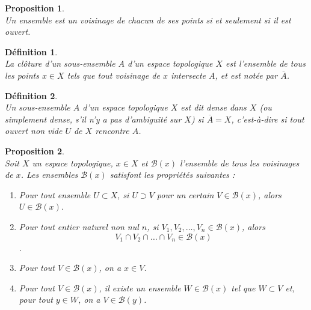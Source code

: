 \documentclass[a4paper, 14pt]{report}
\newtheorem{definition}{Définition}[section]
\newtheorem{proposition}{Proposition}[section]
\begin{document}
\begin{onehalfspace}
{			
			\begin{proposition} \cite{bourbaki2013general} \\
Un ensemble est un voisinage de chacun de ses points si et seulement si il est ouvert.
			\end{proposition}
			
			
			\begin{definition} \cite{bourbaki2013general} \\
La clôture d'un sous-ensemble \( A \) d'un espace topologique \( X \) est l'ensemble de tous les points \( x \in X \) tels que tout voisinage de \( x \) intersecte \( A \), et est notée par \( \overline{A} \).
			\end{definition}
			
			\begin{definition}  \cite{bourbaki2013general} \\
Un sous-ensemble \( A \) d'un espace topologique \( X \) est dit dense dans \( X \) (ou simplement dense, s'il n'y a pas d'ambiguïté sur \( X \)) si \(\overline{A} = X\), c'est-à-dire si tout ouvert non vide \( U \) de \( X \) rencontre \( A \).
			\end{definition}
			
			
			
			\begin{proposition} \cite{bourbaki2013general} \\
Soit \( X \) un espace topologique, \( x \in X \) et \( \mathcal{B}(x) \) l'ensemble de tous les voisinages de \( x \). Les ensembles \( \mathcal{B}(x) \) satisfont les propriétés suivantes :
				\begin{enumerate}
					\item[(V$_1$)] Pour tout ensemble \( U \subset X \), si \( U \supset V \) pour un certain \( V \in \mathcal{B}(x) \), alors \( U \in \mathcal{B}(x) \).
					\item[(V$_2$)] Pour tout entier naturel non nul \( n \), si \( V_1, V_2, \dots, V_n \in \mathcal{B}(x) \), alors \[ V_1 \cap V_2 \cap \dots \cap V_n \in \mathcal{B}(x) \]  .
					\item[(V$_3$)] Pour tout \( V \in \mathcal{B}(x) \), on a \( x \in V \).
					\item[(V$_4$)] Pour tout \( V \in \mathcal{B}(x) \), il existe un ensemble \( W \in \mathcal{B}(x) \) tel que \( W \subset V \) et, pour tout \( y \in W \), on a \( V \in \mathcal{B}(y) \).
				\end{enumerate}
			\end{proposition}
			
}
\end{onehalfspace}
\end{document}
